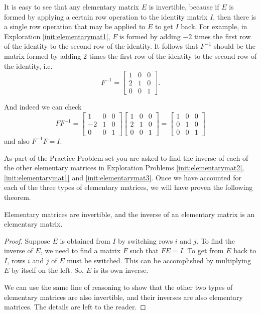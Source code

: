 \documentclass{ximera}
\begin{document}
It is easy to see that any elementary matrix $E$ is invertible, because if $E$ is formed by applying a certain row operation to the identity matrix $I$, then there is a single row operation that may be applied to $E$ to get $I$ back.  For example, in Exploration \ref{init:elementarymat1}, $F$ is formed by adding $-2$ times the first row of the identity to the second row of the identity.  It follows that $F^{-1}$ should be the matrix formed by adding $2$ times the first row of the identity to the second row of the identity, i.e.
 $$F^{-1} =  \begin{bmatrix}  
 1&0&0\\2&1&0\\0&0&1
 \end{bmatrix}.
$$

And indeed we can check $$F F^{-1} = \begin{bmatrix}  
 1&0&0\\-2&1&0\\0&0&1
 \end{bmatrix} \begin{bmatrix}  
 1&0&0\\2&1&0\\0&0&1
 \end{bmatrix} = \begin{bmatrix}  
 1&0&0\\0&1&0\\0&0&1
 \end{bmatrix}$$
 and also $ F^{-1} F = I$.

As part of the Practice Problem set you are asked to find the inverse of each of the other elementary matrices in Exploration Problems \ref{init:elementarymat2}, \ref{init:elementarymat1} and \ref{init:elementarymat3}.  Once we have accounted for each of the three types of elementary matrices, we will have proven the following theorem.  

\begin{theorem}\label{th:elemmatricesinvertible}
Elementary matrices are invertible, and the inverse of an elementary matrix is an elementary matrix.
\end{theorem}

\begin{proof}
Suppose $E$ is obtained from $I$ by switching rows $i$ and $j$.  To find the inverse of $E$, we need to find a matrix $F$ such that $FE=I$.  To get from $E$ back to $I$, rows $i$ and $j$ of $E$ must be switched.  This can be accomplished by multiplying $E$ by itself on the left.  So, $E$ is its own inverse.

We can use the same line of reasoning to show that the other two types of elementary matrices are also invertible, and their inverses are also elementary matrices.  The details are left to the reader. 
\end{proof}
\end{document}
